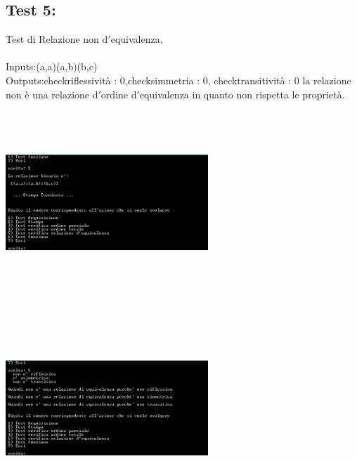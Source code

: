 \documentclass[11pt, a4paper, titlepage, block]{article}
\begin{document}
	\subsection{Test 5:}
	Test di Relazione non d$'$equivalenza.\\
	\\
	Inputs:(a,a)(a,b)(b,c)\\
	Outputs:checkriflessivit\`a : 0,checksimmetria : 0, checktransitivit\`a : 0
	la relazione non \`e una relazione d$'$ordine d$'$equivalenza in quanto non rispetta le propriet\`a.\\
	\includegraphics[width=3in,height=3in,viewport=0 0 300 300]{../Screenshots/Test5Input.png}
	\\
	\includegraphics[width=3in,height=3in,viewport=0 0 300 300]{../Screenshots/Test5Output.png}
	\\
	\\
	\newpage
\end{document}
